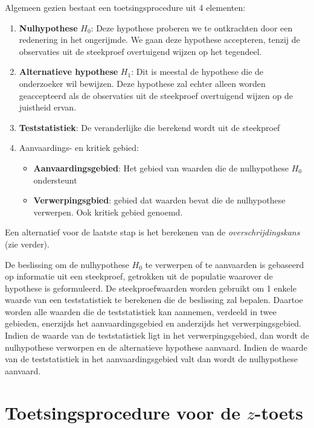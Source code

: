 Algemeen gezien bestaat een toetsingsprocedure uit 4 elementen:
\begin{enumerate}
  \item \textbf{Nulhypothese} $H_{0}$: Deze hypothese proberen we te ontkrachten door een redenering in het ongerijmde. We gaan deze hypothese accepteren, tenzij de observaties uit de steekproef overtuigend wijzen op het tegendeel.
  \item \textbf{Alternatieve hypothese} $H_{1}$: Dit is meestal de hypothese die de onderzoeker wil bewijzen. Deze hypothese zal echter alleen worden geaccepteerd als de observaties uit de steekproef overtuigend wijzen op de juistheid ervan.
  \item \textbf{Teststatistiek}: De veranderlijke die berekend wordt uit de steekproef
  \item Aanvaardings- en kritiek gebied:
  \begin{itemize}
    \item  \textbf{Aanvaardingsgebied}: Het gebied van waarden die de nulhypothese $H_{0}$ ondersteunt
    \item \textbf{Verwerpingsgbied}: gebied dat waarden bevat die de nulhypothese verwerpen. Ook kritiek gebied genoemd.
  \end{itemize}
\end{enumerate}

Een alternatief voor de laatste stap is het berekenen van de \emph{overschrijdingskans} (zie verder).

De beslissing om de nulhypothese $H_{0}$ te verwerpen of te aanvaarden is gebaseerd op informatie uit een steekproef, getrokken uit de populatie waarover de hypothese is geformuleerd. De steekproefwaarden worden gebruikt om 1 enkele waarde van een teststatistiek te berekenen die de beslissing zal bepalen. Daartoe worden alle waarden die de teststatistiek kan aannemen, verdeeld in twee gebieden, enerzijds het aanvaardingsgebied en anderzijds het verwerpingsgebied. Indien de waarde van de teststatistiek ligt in het verwerpingsgebied, dan wordt de nulhypothese verworpen en de alternatieve hypothese aanvaard. Indien de waarde van de teststatistiek in het aanvaardingsgebied valt dan wordt de nulhypothese aanvaard.

\section{Toetsingsprocedure voor de \texorpdfstring{$z$}{z}-toets}
\label{sec:toetsingsprocedure-z-toets}

